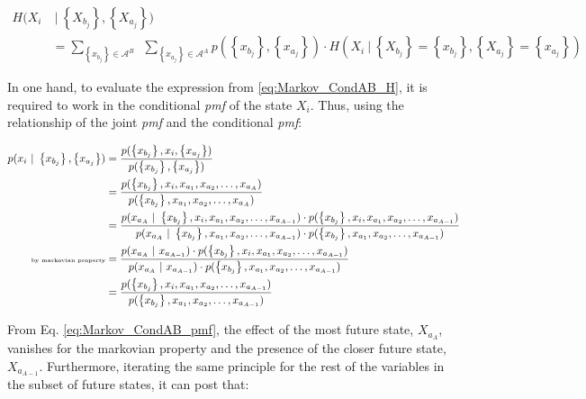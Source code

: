 \begin{align}
\label{eq:Markov_CondAB_H_MargCond}
	H(X_{i} &  \ | \ \left\{X_{b_{j}}\right\} , \left\{X_{a_{j}}\right\})  \nonumber \\
	& = \sum_{  \left\{x_{b_{j}}\right\} \in \mathcal{A}^{B}  }{}{ \ \ \sum_{  \left\{x_{a_{j}}\right\} \in \mathcal{A}^{A}      }{ p(\left\{x_{b_{j}}\right\} , \left\{x_{a_{j}}\right\}) \cdot H(X_{i} \  | \ \left\{X_{b_{j}}\right\} = \left\{x_{b_{j}}\right\} , \left\{X_{a_{j}}\right\} = \left\{x_{a_{j}}\right\})   }}
\end{align}



In one hand, to evaluate the expression from \eqref{eq:Markov_CondAB_H}, it is required to work in the conditional \emph{pmf} of the state $X_{i}$. Thus, using the relationship of the joint \emph{pmf} and the conditional \emph{pmf}:


\begin{align}\label{eq:Markov_CondAB_pmf}
 p(x_{i} \ | \ \left\{x_{b_{j}}\right\} , \left\{x_{a_{j}}\right\}) & = \frac{p(\left\{x_{b_{j}}\right\} , x_{i}, \left\{x_{a_{j}}\right\})}{p(\left\{x_{b_{j}}\right\} , \left\{x_{a_{j}}\right\})} \nonumber \\
    & = \frac{p(\left\{x_{b_{j}}\right\} , x_{i}, x_{a_{1}}, x_{a_{2}}, \ldots,  x_{a_{A}})}{p(\left\{x_{b_{j}}\right\} , x_{a_{1}}, x_{a_{2}}, \ldots,  x_{a_{A}})} \nonumber \\
		    & = \frac{p(x_{a_{A}} \ | \ \left\{x_{b_{j}}\right\} , x_{i}, x_{a_{1}}, x_{a_{2}}, \ldots,  x_{a_{A-1}}) \cdot p(\left\{x_{b_{j}}\right\} , x_{i}, x_{a_{1}}, x_{a_{2}}, \ldots,  x_{a_{A-1}})}{ p(x_{a_{A}} \ | \   \left\{x_{b_{j}}\right\} , x_{a_{1}}, x_{a_{2}}, \ldots,  x_{a_{A-1}})  \cdot p(\left\{x_{b_{j}}\right\} , x_{a_{1}}, x_{a_{2}}, \ldots,  x_{a_{A-1}})} \nonumber \\
				\text{\tiny{by markovian property}}  & = \frac{p(x_{a_{A}} \ | \  x_{a_{A-1}}) \cdot p(\left\{x_{b_{j}}\right\} , x_{i}, x_{a_{1}}, x_{a_{2}}, \ldots,  x_{a_{A-1}})}{ p(x_{a_{A}} \ | \  x_{a_{A-1}})  \cdot p(\left\{x_{b_{j}}\right\} , x_{a_{1}}, x_{a_{2}}, \ldots,  x_{a_{A-1}})} \nonumber \\
				  & = \frac{ p(\left\{x_{b_{j}}\right\} , x_{i}, x_{a_{1}}, x_{a_{2}}, \ldots,  x_{a_{A-1}})}{ p(\left\{x_{b_{j}}\right\} , x_{a_{1}}, x_{a_{2}}, \ldots,  x_{a_{A-1}})} \nonumber \\
\end{align}

From Eq. \eqref{eq:Markov_CondAB_pmf}, the effect of the most future state, $X_{a_{A}}$,  vanishes for the markovian property and the presence of the closer future state, $X_{a_{A-1}}$. Furthermore, iterating the same principle for the rest of the variables in the subset of future states, it can post that:


